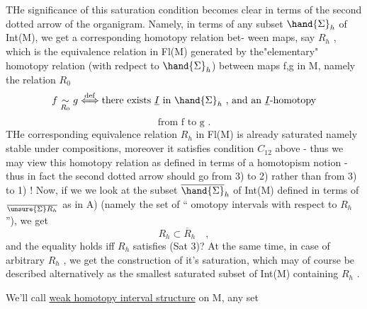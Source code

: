 THe significance of this saturation condition becomes clear in terms
of the second dotted arrow of the organigram.  Namely,  in terms of any
subset $\hand{\Sigma}_h$ of  Int(M),  we get a corresponding homotopy relation bet-%
ween maps,  say $R_h$ ,  which is the  equivalence relation  in
Fl(M)  generated by the"elementary" homotopy relation  (with
redpect to $\hand{\Sigma}_h$) between maps f,g in M,  namely the relation  $R_0$
\[ f \underset{R_0}{\sim} g \overset{\mathrm{def}}{\Longleftrightarrow} \text{there exists $\underline{I}$ in $\hand{\Sigma}_h$ ,  and an $\underline{I}$-homotopy} \]
\[ \text{from f to g .} \]
THe corresponding equivalence relation $R_h$ in Fl(M) is already saturated
namely stable under compositions,  moreover it satisfies condition $C_{12}$
above  -  thus we may view this homotopy relation as defined in terms of
a homotopism notion  -  thus in fact the second dotted arrow should go
from  3)  to 2)  rather than from 3) to 1) !  Now,  if we
we look at the subset $\overline{\hand{\Sigma}}_h$  of Int(M)  defined in terms of $\over{\unsure{\Sigma}}{R}_h$  as in A)
(namely the set of `` omotopy intervals  with respect to $R_h$''),  we get 
\[ R_h \subset \overline{R}_h \quad , \]
and the equality holds iff $R_h$ satisfies (Sat 3)?  At the same time,  in
case of arbitrary $R_h$ ,  we get the construction of it's saturation,  which
may of course  be described alternatively as the smallest  saturated
subset of Int(M) containing $R_h$ .

We'll call \uline{weak homotopy interval structure} on M,   any set
